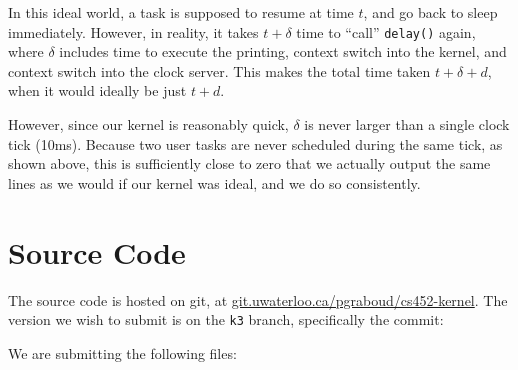 \documentclass[titlepage]{article}
\begin{document}
In this ideal world, a task is supposed to resume at time $t$, and go back to
sleep immediately. However, in reality, it takes $t + \delta$ time to ``call''
\texttt{delay()} again, where $\delta$ includes time to execute the printing,
context switch into the kernel, and context switch into the clock server. This
makes the total time taken $t + \delta + d$, when it would ideally be just
$t + d$.

However, since our kernel is reasonably quick, $\delta$ is never larger than a
single clock tick (10ms). Because two user tasks are never scheduled during
the same tick, as shown above, this is sufficiently close to zero that we
actually output the same lines as we would if our kernel was ideal, and we do so
consistently.

\section{Source Code}
The source code is hosted on git, at \url{git.uwaterloo.ca/pgraboud/cs452-kernel}.
The version we wish to submit is on the \texttt{k3} branch, specifically
the commit:

We are submitting the following files:


\end{document}
